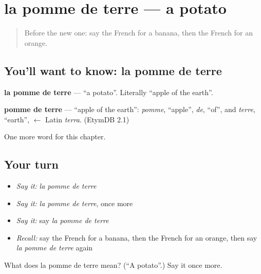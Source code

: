 \section[la pomme de terre]{la pomme de terre — a potato}

\label{lesson:FR-C68-terre}



\begin{quote}
Before the new one: say the French for a banana, then the French for an orange.
\end{quote}

\subsection*{You'll want to know: la pomme de terre}
\textbf{la pomme de terre} — \textquotedblleft{}a potato\textquotedblright{}. Literally \textquotedblleft{}apple of the earth\textquotedblright{}.

\begin{cousinweb}
\textbf{pomme de terre} — \textquotedblleft{}apple of the earth\textquotedblright{}: \emph{pomme}, \textquotedblleft{}apple\textquotedblright{}, \emph{de}, \textquotedblleft{}of\textquotedblright{}, and \emph{terre}, \textquotedblleft{}earth\textquotedblright{}, $\leftarrow$ Latin \emph{terra}. (EtymDB 2.1)
\end{cousinweb}

\begin{grammarlens}[title={What you've built}]
One more word for this chapter.
\end{grammarlens}

\subsection*{Your turn}
\begin{itemize}
\raggedright
  \item \emph{Say it:} \emph{la pomme de terre}
  \item \emph{Say it:} \emph{la pomme de terre}, once more
  \item \emph{Say it:} say \emph{la pomme de terre}
  \item \emph{Recall:} say the French for a banana, then the French for an orange, then say \emph{la pomme de terre} again
\end{itemize}

\begin{tcolorbox}[breakable,colback=teal!4,colframe=teal!35!black,title={Before you move on}]
What does la pomme de terre mean? (\textquotedblleft{}A potato\textquotedblright{}.) Say it once more.
\end{tcolorbox}
